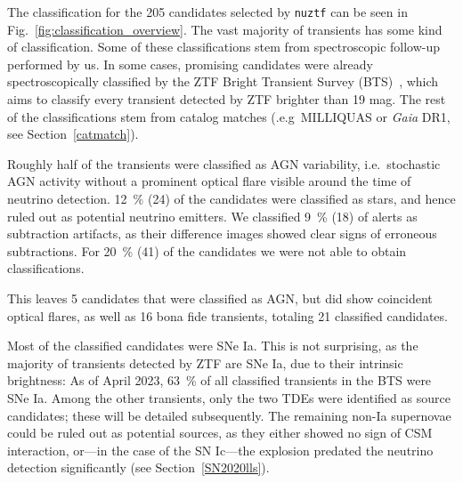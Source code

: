 The classification for the 205 candidates selected by \texttt{nuztf} can be seen in Fig.~\ref{fig:classification_overview}. The vast majority of transients has some kind of classification. Some of these classifications stem from spectroscopic follow-up performed by us. In some cases, promising candidates were already spectroscopically classified by the ZTF Bright Transient Survey (BTS)~, which aims to classify every transient detected by ZTF brighter than 19 mag. The rest of the classifications stem from catalog matches (.e.g\ MILLIQUAS or \textit{Gaia} DR1, see Section~\ref{catmatch}).

Roughly half of the transients were classified as AGN variability, i.e.\ stochastic AGN activity without a prominent optical flare visible around the time of neutrino detection. \SI{12}{\percent} (24) of the candidates were classified as stars, and hence ruled out as potential neutrino emitters. We classified \SI{9}{\percent} (18) of alerts as subtraction artifacts, as their difference images showed clear signs of erroneous subtractions. For \SI{20}{\percent} (41) of the candidates we were not able to obtain classifications.

This leaves 5 candidates that were classified as AGN, but did show coincident optical flares, as well as 16 bona fide transients, totaling 21 classified candidates.

Most of the classified candidates were SNe Ia. This is not surprising, as the majority of transients detected by ZTF are SNe Ia, due to their intrinsic brightness: As of April 2023, \SI{63}{\percent} of all classified transients in the BTS were SNe Ia. Among the other transients, only the two TDEs were identified as source candidates; these will be detailed subsequently. The remaining non-Ia supernovae could be ruled out as potential sources, as they either showed no sign of CSM interaction, or---in the case of the SN Ic---the explosion predated the neutrino detection significantly (see Section~\ref{SN2020lls}).

